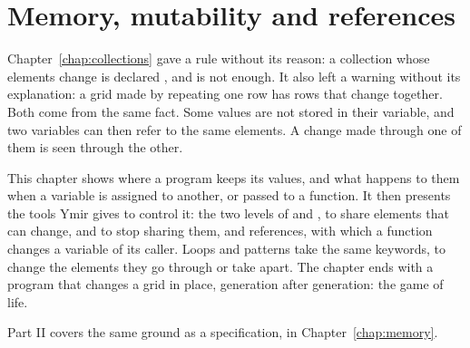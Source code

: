 \chapter{Memory, mutability and references}
\label{chap:mutability}

Chapter~\ref{chap:collections} gave a rule without its reason: a collection
whose elements change is declared , and  is not enough.
It also left a warning without its explanation: a grid made by repeating one
row has rows that change together. Both come from the same fact. Some values
are not stored in their variable, and two variables can then refer to the same
elements. A change made through one of them is seen through the other.

This chapter shows where a program keeps its values, and what happens to them
when a variable is assigned to another, or passed to a function. It then
presents the tools Ymir gives to control it: the two levels of  and
,  to share elements that can change,  and
 to stop sharing them, and references, with which a function
changes a variable of its caller. Loops and patterns take the same keywords, to
change the elements they go through or take apart. The chapter ends with a
program that changes a grid in place, generation after generation: the game of
life.

Part II covers the same ground as a specification, in
Chapter~\ref{chap:memory}.

\minitoc%












